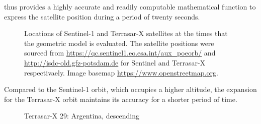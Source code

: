 \par
{} thus provides a highly accurate and readily computable mathematical function to express the satellite position during a period of twenty seconds. 
\begin{figure}
	\caption{Locations of Sentinel-1 and Terrasar-X  satellites at the times that the geometric model is evaluated. The satellite positions were sourced from \url{https://qc.sentinel1.eo.esa.int/aux\_poeorb/} and \url{http://isdc-old.gfz-potsdam.de} for Sentinel and Terrasar-X respectivaely. Image basemap \textcopyright \url{https://www.openstreetmap.org}.}
	\label{fg:orbitMap}
\end{figure}
Compared to the Sentinel-1 orbit, which occupies a higher altitude, the expansion for the Terrasar-X orbit maintains its accuracy for a shorter period of time.
\begin{figure}[ht]
\begin{subfigure}{.5\textwidth}
  \centering
  \resizebox{\textwidth}{!}{}  
  \label{fg:29a}
\end{subfigure}
\begin{subfigure}{.5\textwidth}
  \centering
  \resizebox{\textwidth}{!}{} 
  \label{fg:29b}
\end{subfigure} 
\caption{Terrasar-X 29: Argentina, descending}
\label{fg:29}
\end{figure}
